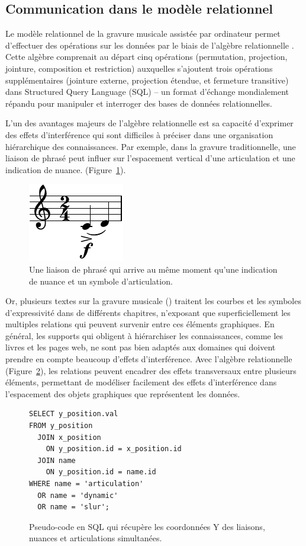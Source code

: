 \documentclass{article}
\begin{document}
\subsection{Communication dans le modèle relationnel}\label{sec:communication}
Le modèle relationnel de la gravure musicale assistée par ordinateur
permet d'effectuer des opérations sur les données par le biais de l'algèbre
relationnelle \cite{codd1970relational}. Cette algèbre comprenait au départ
cinq opérations (permutation, projection, jointure,
composition et restriction) auxquelles s'ajoutent trois opérations
supplémentaires (jointure externe, projection étendue, et fermeture
transitive) dans Structured Query Language (SQL) \cite{date2011sql} --
un format d'échange mondialement répandu pour manipuler et interroger des bases de
données relationnelles.\par
L'un des avantages majeurs de l'algèbre relationnelle est sa capacité
d'exprimer des effets d'interférence qui sont difficiles à
préciser dans une organisation hiérarchique des connaissances. Par exemple,
dans la gravure traditionnelle, une liaison de phrasé peut influer sur
l'espacement vertical d'une articulation et une indication de nuance.
(Figure~\ref{figure:slur_d_a}).
\begin{figure}
\begin{center}
\includegraphics{slur_dynamic_articulation}
\end{center}
\caption{Une liaison de phrasé qui arrive au même moment qu'une indication
de nuance et un symbole d'articulation.}
\label{figure:slur_d_a}
\end{figure}
Or, plusieurs textes sur la gravure musicale (\cite{Read64}\-\cite{Ross70}\-\cite{Gould11}) traitent
les courbes et les symboles d'expressivité dans de différents chapitres,
n'exposant que superficiellement les
multiples relations qui peuvent survenir entre ces éléments graphiques. En
général, les supports qui obligent à hiérarchiser les connaissances, comme
les livres et les pages web, ne sont pas bien adaptés aux domaines qui
doivent prendre en compte beaucoup d'effets d'interférence. Avec l'algèbre
relationnelle (Figure~\ref{figure:sql}), les relations peuvent encadrer des effets
transversaux entre plusieurs éléments,
permettant de
modéliser facilement des effets d'interférence dans l'espacement des objets
graphiques que représentent les données.
\begin{figure}
\begin{Verbatim}[frame=single,fontsize=\relsize{-1}]
SELECT y_position.val
FROM y_position
  JOIN x_position
    ON y_position.id = x_position.id
  JOIN name
    ON y_position.id = name.id
WHERE name = 'articulation'
  OR name = 'dynamic'
  OR name = 'slur';
\end{Verbatim}
\caption{Pseudo-code en SQL qui récupère les coordonnées Y des liaisons,
nuances et articulations simultanées.}
\label{figure:sql}
\end{figure}
\end{document}
